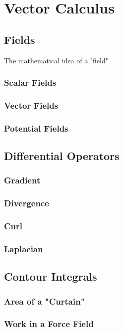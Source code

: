 \section{Vector Calculus} 

\subsection{Fields}
The mathematical idea of a "field"

\subsubsection{Scalar Fields}
\subsubsection{Vector Fields}
\subsubsection{Potential Fields}

\subsection{Differential Operators}
\subsubsection{Gradient}
\subsubsection{Divergence}
\subsubsection{Curl}
\subsubsection{Laplacian}


\subsection{Contour Integrals}
\subsubsection{Area of a "Curtain"}
\subsubsection{Work in a Force Field}
